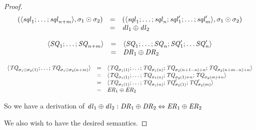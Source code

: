 \documentclass[numbers,10pt,preprint\ifanon ,nocopyrightspace\fi]{sigplanconf}
\begin{document}
\begin{proof}
  \[
    \begin{array}{rcl}
      (\langle\mathit{sql}_1;\ldots;\mathit{sql}_{n+m}\rangle,
      \sigma_1\odot\sigma_2)
      & = & (\langle\mathit{sql}_1;\ldots;\mathit{sql}_n;
            \mathit{sql}_1';\ldots;\mathit{sql}_m'\rangle,
            \sigma_1\odot\sigma_2)\\
      & = & \mathit{dl}_1\oplus\mathit{dl}_2
    \end{array}
  \]


  \[
    \begin{array}{rcl}
      \langle\mathit{SQ}_1;\ldots;\mathit{SQ}_{n+m}\rangle
      & = & \langle\mathit{SQ}_1;\ldots;\mathit{SQ}_n;
            \mathit{SQ}_1';\ldots\mathit{SQ}_n'\rangle\\
      & = & \mathit{DR}_1\oplus\mathit{DR}_2
    \end{array}
  \]


  \[
    \begin{array}{rcl}
      \langle\mathit{TQ}_{\sigma_1\odot\sigma_2(1)};\ldots;
      \mathit{TQ}_{\sigma_1\odot\sigma_2(n+m)}\rangle
      & = & \langle\mathit{TQ}_{\sigma_1(1)};\ldots;\mathit{TQ}_{\sigma_1(n)};
            \mathit{TQ}_{\sigma_2(n+1-n)+n};\mathit{TQ}_{\sigma_2(n+m-n)+n}\rangle\\
      & = & \langle\mathit{TQ}_{\sigma_1(1)};\ldots;\mathit{TQ}_{\sigma_1(n)};
            \mathit{TQ}_{\sigma_2(1)+n};\mathit{TQ}_{\sigma_2(m)+n}\rangle\\
      & = & \langle\mathit{TQ}_{\sigma_1(1)};\ldots;\mathit{TQ}_{\sigma_1(n)};
            \mathit{TQ}_{\sigma_2(1)}';\mathit{TQ}_{\sigma_2(m)}'\rangle\\
      & = & \mathit{ER}_1\oplus\mathit{ER}_2
    \end{array}
  \]

  So we have a derivation of $\mathit{dl}_1\oplus\mathit{dl}_2 :
  \mathit{DR}_1\oplus\mathit{DR}_2 \Leftrightarrow
  \mathit{ER}_1\oplus\mathit{ER}_2$

  We also wish to have the desired semantics.


\end{proof}
\end{document}

